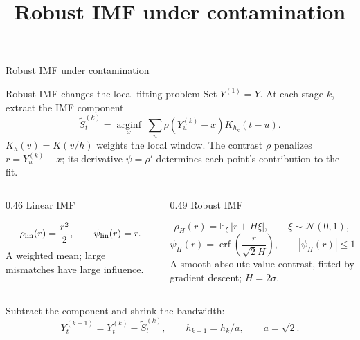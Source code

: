 \documentclass[aspectratio=169,14pt]{beamer}
\title{Robust IMF under contamination}
\author{}
\date{}
\begin{document}
\begin{frame}[plain]
    \vfill
    {Robust IMF under contamination\par}
    \vfill
\end{frame}

\begin{frame}{Robust IMF changes the local fitting problem}
    Set \(Y^{(1)}=Y\). At each stage \(k\), extract the IMF component
    \[
        \widetilde S^{(k)}_t=\operatorname*{arginf}_{x}\;
        \sum_u \rho\!\left(Y^{(k)}_u-x\right)K_{h_k}(t-u).
    \]
    \(K_h(v)=K(v/h)\) weights the local window. The contrast \(\rho\) penalizes
    \(r=Y^{(k)}_u-x\); its derivative \(\psi=\rho'\) determines each point's contribution to the fit.
    \vspace{4mm}
    \begin{columns}[T,onlytextwidth]
        \begin{column}{0.46\textwidth}
            {\color{blue}\large Linear IMF}\par
            \[
                \rho_{\rm lin}(r)=\frac{r^2}{2},\qquad \psi_{\rm lin}(r)=r.
            \]
            A weighted mean; large mismatches have large influence.
        \end{column}
        \begin{column}{0.49\textwidth}
            {\color{orange}\large Robust IMF}\par
            \[
                \rho_H(r)=\mathbb E_{\xi}\,|r+H\xi|,\qquad \xi\sim\mathcal N(0,1),
            \]
            \[
                \psi_H(r)=\operatorname{erf}\!\left(\frac{r}{\sqrt{2}H}\right),\qquad |\psi_H(r)|\leq1.
            \]
            A smooth absolute-value contrast, fitted by gradient descent; \(H=2\sigma\).
        \end{column}
    \end{columns}
    \vspace{4mm}
    Subtract the component and shrink the bandwidth:
    \[
        Y^{(k+1)}_t=Y^{(k)}_t-\widetilde S^{(k)}_t,
        \qquad h_{k+1}=h_k/a,\qquad a=\sqrt{2}.
    \]
\end{frame}
\end{document}
